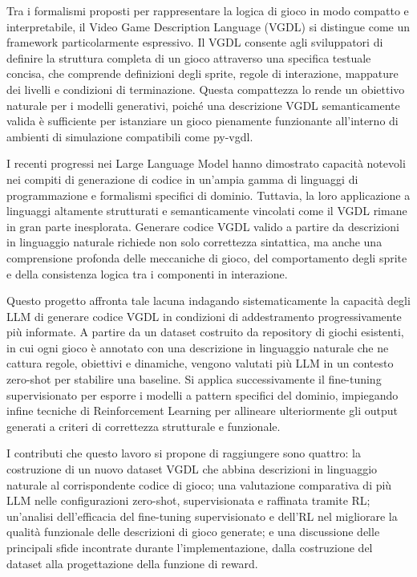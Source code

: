 \documentclass[final,5p,times,twocolumn]{elsarticle}
\begin{document}
Tra i formalismi proposti per rappresentare la logica di gioco in modo compatto e interpretabile, il Video Game Description Language (VGDL) \citep{6633610} si distingue come un framework particolarmente espressivo. Il VGDL consente agli sviluppatori di definire la struttura completa di un gioco attraverso una specifica testuale concisa, che comprende definizioni degli sprite, regole di interazione, mappature dei livelli e condizioni di terminazione. Questa compattezza lo rende un obiettivo naturale per i modelli generativi, poiché una descrizione VGDL semanticamente valida è sufficiente per istanziare un gioco pienamente funzionante all'interno di ambienti di simulazione compatibili come py-vgdl.

I recenti progressi nei Large Language Model hanno dimostrato capacità notevoli nei compiti di generazione di codice in un'ampia gamma di linguaggi di programmazione e formalismi specifici di dominio. Tuttavia, la loro applicazione a linguaggi altamente strutturati e semanticamente vincolati come il VGDL rimane in gran parte inesplorata. Generare codice VGDL valido a partire da descrizioni in linguaggio naturale richiede non solo correttezza sintattica, ma anche una comprensione profonda delle meccaniche di gioco, del comportamento degli sprite e della consistenza logica tra i componenti in interazione.

Questo progetto affronta tale lacuna indagando sistematicamente la capacità degli LLM di generare codice VGDL in condizioni di addestramento progressivamente più informate. A partire da un dataset costruito da repository di giochi esistenti, in cui ogni gioco è annotato con una descrizione in linguaggio naturale che ne cattura regole, obiettivi e dinamiche, vengono valutati più LLM in un contesto zero-shot per stabilire una baseline. Si applica successivamente il fine-tuning supervisionato per esporre i modelli a pattern specifici del dominio, impiegando infine tecniche di Reinforcement Learning per allineare ulteriormente gli output generati a criteri di correttezza strutturale e funzionale.

I contributi che questo lavoro si propone di raggiungere sono quattro: la costruzione di un nuovo dataset VGDL che abbina descrizioni in linguaggio naturale al corrispondente codice di gioco; una valutazione comparativa di più LLM nelle configurazioni zero-shot, supervisionata e raffinata tramite RL; un'analisi dell'efficacia del fine-tuning supervisionato e dell'RL nel migliorare la qualità funzionale delle descrizioni di gioco generate; e una discussione delle principali sfide incontrate durante l'implementazione, dalla costruzione del dataset alla progettazione della funzione di reward.
\end{document}
